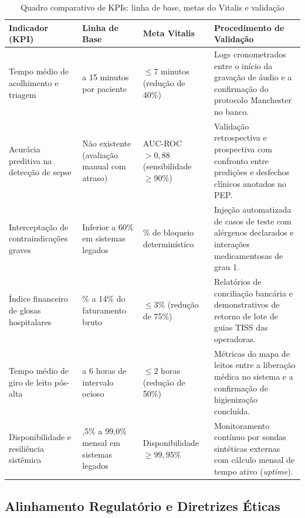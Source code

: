 \begin{table}[!htbp]
\centering
\small
\setlength{\tabcolsep}{5pt}
\caption{Quadro comparativo de KPIs: linha de base, metas do Vitalis e validação}
\label{tab:kpis_projeto}
\begin{tabularx}{\textwidth}{>{\raggedright\arraybackslash}p{3.0cm} >{\raggedright\arraybackslash}p{2.8cm} >{\raggedright\arraybackslash}p{2.8cm} >{\raggedright\arraybackslash}X}
\toprule
\textbf{Indicador (KPI)} & \textbf{Linha de Base} & \textbf{Meta Vitalis} & \textbf{Procedimento de Validação} \\
\midrule
Tempo médio de acolhimento e triagem &
12 a 15 minutos por paciente &
$\le 7$ minutos (redução de 40\%) &
Logs cronometrados entre o início da gravação de áudio e a confirmação do protocolo Manchester no banco. \\
\addlinespace
Acurácia preditiva na detecção de sepse &
Não existente (avaliação manual com atraso) &
AUC-ROC $> 0{,}88$ (sensibilidade $\ge 90\%$) &
Validação retrospectiva e prospectiva com confronto entre predições e desfechos clínicos anotados no PEP. \\
\addlinespace
Interceptação de contraindicações graves &
Inferior a 60\% em sistemas legados &
100\% de bloqueio determinístico &
Injeção automatizada de casos de teste com alérgenos declarados e interações medicamentosas de grau 1. \\
\addlinespace
Índice financeiro de glosas hospitalares &
8\% a 14\% do faturamento bruto &
$\le 3\%$ (redução de 75\%) &
Relatórios de conciliação bancária e demonstrativos de retorno de lote de guias TISS das operadoras. \\
\addlinespace
Tempo médio de giro de leito pós-alta &
3 a 6 horas de intervalo ocioso &
$\le 2$ horas (redução de 50\%) &
Métricas do mapa de leitos entre a liberação médica no sistema e a confirmação de higienização concluída. \\
\addlinespace
Disponibilidade e resiliência sistêmica &
98,5\% a 99,0\% mensal em sistemas legados &
Disponibilidade $\ge 99{,}95\%$ &
Monitoramento contínuo por sondas sintéticas externas com cálculo mensal de tempo ativo (\textit{uptime}). \\
\bottomrule
\end{tabularx}
\end{table}

\subsection{Alinhamento Regulatório e Diretrizes Éticas}
\label{subsec:alinhamento_regulatorio}

